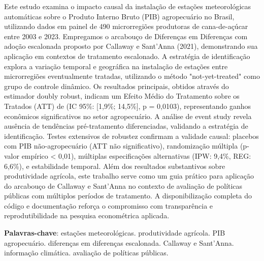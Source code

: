 \documentclass[
	12pt,				%
	oneside,			%
	a4paper,			%
	english,			%
	french,				%
	spanish,			%
	brazil				%
	]{abntex2}
\begin{document}
\setlength{\absparsep}{18pt} %
\begin{resumo}
Este estudo examina o impacto causal da instalação de estações meteorológicas automáticas sobre o Produto Interno Bruto (PIB) agropecuário no Brasil, utilizando dados em painel de 490 microrregiões produtoras de cana-de-açúcar entre 2003 e 2023. Empregamos o arcabouço de Diferenças em Diferenças com adoção escalonada proposto por Callaway e Sant'Anna (2021), demonstrando sua aplicação em contextos de tratamento escalonado. A estratégia de identificação explora a variação temporal e geográfica na instalação de estações entre microrregiões eventualmente tratadas, utilizando o método "not-yet-treated" como grupo de controle dinâmico. Os resultados principais, obtidos através do estimador doubly robust, indicam um Efeito Médio do Tratamento sobre os Tratados (ATT) de \mainattpct{} (IC 95\%: [1,9\%; 14,5\%], p = 0,0103), representando ganhos econômicos significativos no setor agropecuário. A análise de event study revela ausência de tendências pré-tratamento diferenciadas, validando a estratégia de identificação. Testes extensivos de robustez confirmam a validade causal: placebos com PIB não-agropecuário (ATT não significativo), randomização múltipla (p-valor empírico < 0,01), múltiplas especificações alternativas (IPW: 9,4\%, REG: 6,6\%), e estabilidade temporal. Além dos resultados substantivos sobre produtividade agrícola, este trabalho serve como um guia prático para aplicação do arcabouço de Callaway e Sant'Anna no contexto de avaliação de políticas públicas com múltiplos períodos de tratamento. A disponibilização completa do código e documentação reforça o compromisso com transparência e reprodutibilidade na pesquisa econométrica aplicada.

 \textbf{Palavras-chave}: estações meteorológicas. produtividade agrícola. PIB agropecuário. diferenças em diferenças escalonada. Callaway e Sant'Anna. informação climática. avaliação de políticas públicas.
\end{resumo}
\end{document}
